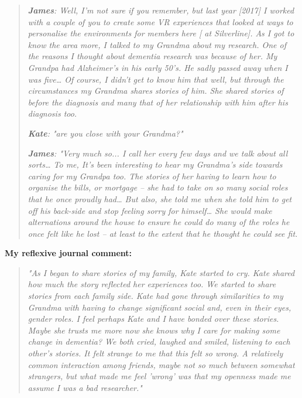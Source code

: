 \begin{quote}
 \textit{   
\textbf{James}: Well, I'm not sure if you remember, but last year [2017] I worked with a couple of you to create some VR experiences that looked at ways to personalise the environments for members here [ at Silverline]. As I got to know the area more, I talked to my Grandma about my research. One of the reasons I thought about dementia research was because of her. My Grandpa had Alzheimer's in his early 50's. He sadly passed away when I was five… Of course, I didn't get to know him that well, but through the circumstances my Grandma shares stories of him. She shared stories of before the diagnosis and many that of her relationship with him after his diagnosis too.}\par


\textit{\textbf{Kate}: "are you close with your Grandma?"
}\par


\textit{\textbf{James}: "Very much so... I call her every few days and we talk about all sorts… To me, It's been interesting to hear my Grandma's side towards caring for my Grandpa too. The stories of her having to learn how to organise the bills, or mortgage – she had to take on so many social roles that he once proudly had… But also, she told me when she told him to get off his back-side and stop feeling sorry for himself… She would make alternations around the house to ensure he could do many of the roles he once felt like he lost – at least to the extent that he thought he could see fit. }
\end{quote}

\textbf{My reflexive journal comment: 
}
\begin{quote}
\textit{"As I began to share stories of my family, Kate started to cry. Kate shared how much the story reflected her experiences too. We started to share stories from each family side. Kate had gone through similarities to my Grandma with having to change significant social and, even in their eyes, gender roles. I feel perhaps Kate and I have bonded over these stories. Maybe she trusts me more now she knows why I care for making some change in dementia? We both cried, laughed and smiled, listening to each other's stories. It felt strange to me that this felt so wrong. A relatively common interaction among friends, maybe not so much between somewhat strangers, but what made me feel 'wrong' was that my openness made me assume I was a bad researcher."}
\end{quote}

